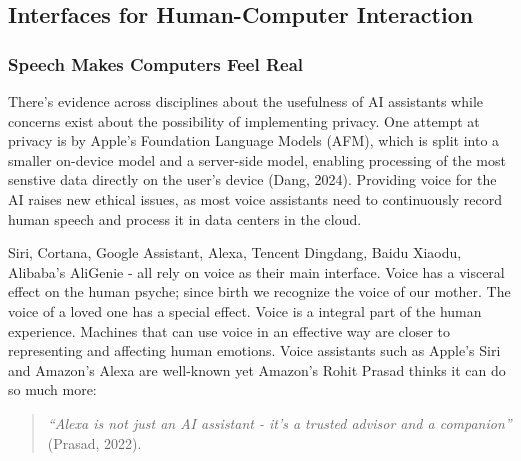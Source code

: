 \documentclass[
  12pt,
  letterpaper,
  DIV=11,
  numbers=noendperiod]{scrartcl}
\begin{document}
\subsection{Interfaces for Human-Computer
Interaction}\label{interfaces-for-human-computer-interaction}

\subsubsection{Speech Makes Computers Feel
Real}\label{speech-makes-computers-feel-real}

There's evidence across disciplines about the usefulness of AI
assistants while concerns exist about the possibility of implementing
privacy. One attempt at privacy is by Apple's Foundation Language Models
(AFM), which is split into a smaller on-device model and a server-side
model, enabling processing of the most senstive data directly on the
user's device (Dang, 2024). Providing voice for the AI raises new
ethical issues, as most voice assistants need to continuously record
human speech and process it in data centers in the cloud.

Siri, Cortana, Google Assistant, Alexa, Tencent Dingdang, Baidu Xiaodu,
Alibaba's AliGenie - all rely on voice as their main interface. Voice
has a visceral effect on the human psyche; since birth we recognize the
voice of our mother. The voice of a loved one has a special effect.
Voice is a integral part of the human experience. Machines that can use
voice in an effective way are closer to representing and affecting human
emotions. Voice assistants such as Apple's Siri and Amazon's Alexa are
well-known yet Amazon's Rohit Prasad thinks it can do so much more:

\begin{quote}
\emph{``Alexa is not just an AI assistant - it's a trusted advisor and a
companion''} (Prasad, 2022).
\end{quote}
\end{document}
